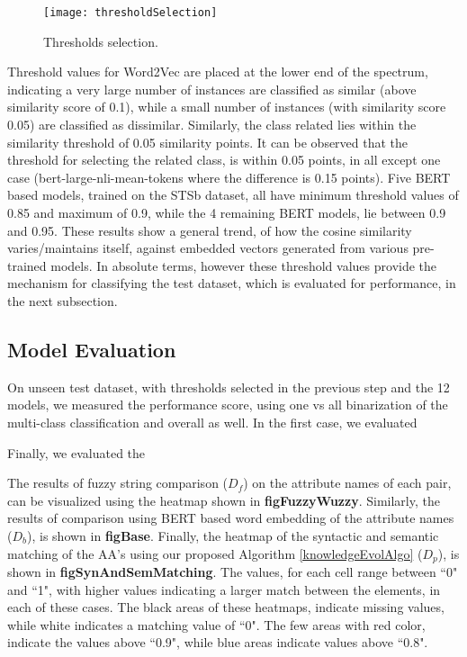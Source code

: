\documentclass{ieeeaccess}
\begin{document}
\begin{figure}[t!]
	\centering
	\texttt{[image: thresholdSelection]}
	\caption{Thresholds selection.}
	\label{fig:thresholdSelection}
\end{figure}

Threshold values for Word2Vec are placed at the lower end of the spectrum, indicating a very large number of instances are classified as similar (above similarity score of 0.1), while a small number of instances (with similarity score 0.05) are classified as dissimilar. Similarly, the class related lies within the similarity threshold of 0.05 similarity points. It can be observed that the threshold for selecting the related class, is within 0.05 points, in all except one case (bert-large-nli-mean-tokens where the difference is 0.15 points). Five BERT based models, trained on the STSb dataset, all have minimum threshold values of 0.85 and maximum of 0.9, while the 4 remaining BERT models, lie between 0.9 and 0.95. These results show a general trend, of how the cosine similarity varies/maintains itself, against embedded vectors generated from various pre-trained models. In absolute terms, however these threshold values provide the mechanism for classifying the test dataset, which is evaluated for performance, in the next subsection.

\subsection{Model Evaluation}
On unseen test dataset, with thresholds selected in the previous step and the 12 models, we measured the performance score, using one vs all binarization of the multi-class classification and overall as well. 
In the first case, we evaluated 






Finally, we evaluated the 


The results of fuzzy string comparison ($D_f$) on the attribute names of each pair, can be visualized using the heatmap shown in \textbf{figFuzzyWuzzy}. Similarly, the results of comparison using BERT based word embedding of the attribute names ($D_b$), is shown in \textbf{figBase}. Finally, the heatmap of the syntactic and semantic matching of the AA's using our proposed Algorithm \ref{knowledgeEvolAlgo} ($D_p$), is shown in \textbf{figSynAndSemMatching}. The values, for each cell range between ``0" and ``1", with higher values indicating a larger match between the elements, in each of these cases. The black areas of these heatmaps, indicate missing values, while white indicates a matching value of ``0". The few areas with red color, indicate the values above ``0.9", while blue areas indicate values above ``0.8". 
\end{document}
